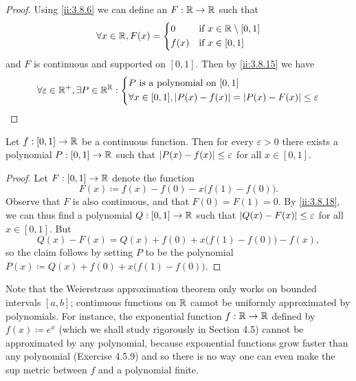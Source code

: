\begin{proof}
  Using \cref{ii:3.8.6} we can define an \(F : \mathbb{R} \to \mathbb{R}\) such that
  \[
    \forall x \in \mathbb{R}, F(x) = \begin{dcases}
      0    & \text{if } x \in \mathbb{R} \setminus [0, 1] \\
      f(x) & \text{if } x \in [0, 1]
    \end{dcases}
  \]
  and \(F\) is continuous and supported on \([0, 1]\).
  Then by \cref{ii:3.8.15} we have
  \[
    \forall \varepsilon \in \mathbb{R}^+, \exists P \in \mathbb{R}^{\mathbb{R}} : \begin{dcases}
      P \text{ is a polynomial on } [0, 1] \\
      \forall x \in [0, 1], \left\lvert P(x) - f(x)\right\rvert = \left\lvert P(x) - F(x)\right\rvert \leq \varepsilon
    \end{dcases}
  \]
\end{proof}

\begin{cor}\label{ii:3.8.19}
  Let \(f : [0, 1] \to \mathbb{R}\) be a continuous function.
  Then for every \(\varepsilon > 0\) there exists a polynomial \(P : [0, 1] \to \mathbb{R}\) such that \(\left\lvert P(x) - f(x)\right\rvert \leq \varepsilon\) for all \(x \in [0, 1]\).
\end{cor}

\begin{proof}
  Let \(F : [0, 1] \to \mathbb{R}\) denote the function
  \[
    F(x) \coloneqq f(x) - f(0) - x \big(f(1) - f(0)\big).
  \]
  Observe that \(F\) is also continuous, and that \(F(0) = F(1) = 0\).
  By \cref{ii:3.8.18}, we can thus find a polynomial \(Q : [0, 1] \to \mathbb{R}\) such that \(\left\lvert Q(x) - F(x)\right\rvert \leq \varepsilon\) for all \(x \in [0, 1]\).
  But
  \[
    Q(x) - F(x) = Q(x) + f(0) + x \big(f(1) - f(0)\big) - f(x),
  \]
  so the claim follows by setting \(P\) to be the polynomial \(P(x) \coloneqq Q(x) + f(0) + x \big(f(1) - f(0)\big)\).
\end{proof}

\begin{rmk}\label{ii:3.8.20}
  Note that the Weierstrass approximation theorem only works on bounded intervals \([a, b]\);
  continuous functions on \(\mathbb{R}\) cannot be uniformly approximated by polynomials.
  For instance, the exponential function \(f : \mathbb{R} \to \mathbb{R}\) defined by \(f(x) \coloneqq e^x\) (which we shall study rigorously in Section 4.5) cannot be approximated by any polynomial, because exponential functions grow faster than any polynomial (Exercise 4.5.9) and so there is no way one can even make the sup metric between \(f\) and a polynomial finite.
\end{rmk}

